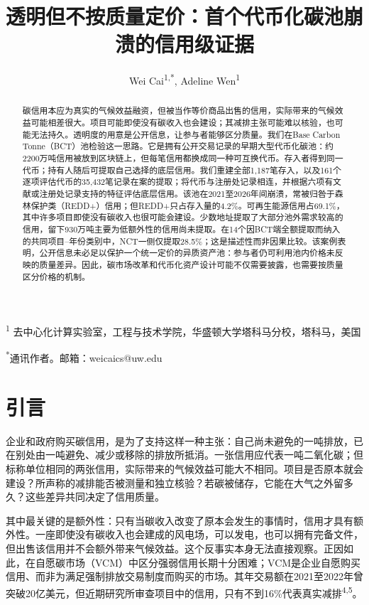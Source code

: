 \documentclass[12pt,a4paper]{article}
\title{透明但不按质量定价：首个代币化碳池崩溃的信用级证据}
\author{Wei Cai\textsuperscript{1,*}, Adeline Wen\textsuperscript{1}}
\date{}
\begin{document}
\maketitle

\noindent\textsuperscript{1} 去中心化计算实验室，工程与技术学院，华盛顿大学塔科马分校，塔科马，美国

\noindent\textsuperscript{*}通讯作者。邮箱：weicaics@uw.edu

\begin{abstract}
碳信用本应为真实的气候效益融资，但被当作等价商品出售的信用，实际带来的气候效益可能相差很大。项目可能即使没有碳收入也会建设；其减排主张可能难以核验，也可能无法持久。透明度的用意是公开信息，让参与者能够区分质量。我们在Base Carbon Tonne（BCT）池检验这一思路。它是拥有公开交易记录的早期大型代币化碳池：约2200万吨信用被放到区块链上，但每笔信用都换成同一种可互换代币。存入者得到同一代币；持有人随后可提取自己选择的底层信用。我们重建全部1,187笔存入，以及161个逐项评估代币的35,432笔记录在案的提取；将代币与注册处记录相连，并根据六项有文献或注册处记录支持的特征评估底层信用。该池在2021至2026年间崩溃，常被归咎于森林保护类（REDD+）信用；但REDD+只占存入量的4.2\%。可再生能源信用占69.1\%，其中许多项目即使没有碳收入也很可能会建设。少数地址提取了大部分池外需求较高的信用，留下930万吨主要为低额外性的信用尚未提取。在14个因BCT端全额提取而纳入的共同项目--年份类别中，NCT一侧仅提取28.5\%；这是描述性而非因果比较。该案例表明，公开信息未必足以保护一个统一定价的异质资产池：参与者仍可利用池内价格未反映的质量差异。因此，碳市场改革和代币化资产设计可能不仅需要披露，也需要按质量区分价格的机制。
\end{abstract}

\section*{引言}
企业和政府购买碳信用，是为了支持这样一种主张：自己尚未避免的一吨排放，已在别处由一吨避免、减少或移除的排放所抵消。一张信用应代表一吨二氧化碳；但标称单位相同的两张信用，实际带来的气候效益可能大不相同。项目是否原本就会建设？所声称的减排能否被测量和独立核验？若碳被储存，它能在大气之外留多久？这些差异共同决定了信用质量。

其中最关键的是额外性：只有当碳收入改变了原本会发生的事情时，信用才具有额外性。一座即使没有碳收入也会建成的风电场，可以发电，也可以拥有完备文件，但出售该信用并不会额外带来气候效益。这个反事实本身无法直接观察。正因如此，在自愿碳市场（VCM）中区分强弱信用长期十分困难；VCM是企业自愿购买信用、而非为满足强制排放交易制度而购买的市场。其年交易额在2021至2022年曾突破20亿美元，但近期研究所审查项目中的信用，只有不到16\%代表真实减排\textsuperscript{4,5}。
\end{document}
